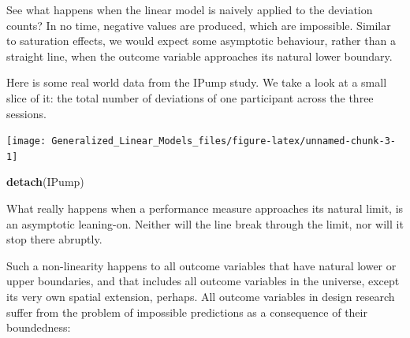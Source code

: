 \documentclass[]{svmono}
\newenvironment{Shaded}{\begin{snugshade}}{\end{snugshade}}
\newcommand{\KeywordTok}[1]{\textcolor[rgb]{0.13,0.29,0.53}{\textbf{#1}}}
\newcommand{\DataTypeTok}[1]{\textcolor[rgb]{0.13,0.29,0.53}{#1}}
\newcommand{\DecValTok}[1]{\textcolor[rgb]{0.00,0.00,0.81}{#1}}
\newcommand{\StringTok}[1]{\textcolor[rgb]{0.31,0.60,0.02}{#1}}
\newcommand{\OperatorTok}[1]{\textcolor[rgb]{0.81,0.36,0.00}{\textbf{#1}}}
\newcommand{\NormalTok}[1]{#1}
\begin{document}
See what happens when the linear model is naively applied to the
deviation counts? In no time, negative values are produced, which are
impossible. Similar to saturation effects, we would expect some
asymptotic behaviour, rather than a straight line, when the outcome
variable approaches its natural lower boundary.

Here is some real world data from the IPump study. We take a look at a
small slice of it: the total number of deviations of one participant
across the three sessions.

\begin{Shaded}
\end{Shaded}

\texttt{[image: Generalized\_Linear\_Models\_files/figure-latex/unnamed-chunk-3-1]}

\begin{Shaded}
\begin{Highlighting}[]
\KeywordTok{detach}\NormalTok{(IPump)}
\end{Highlighting}
\end{Shaded}

What really happens when a performance measure approaches its natural
limit, is an asymptotic leaning-on. Neither will the line break through
the limit, nor will it stop there abruptly.

Such a non-linearity happens to all outcome variables that have natural
lower or upper boundaries, and that includes all outcome variables in
the universe, except its very own spatial extension, perhaps. All
outcome variables in design research suffer from the problem of
impossible predictions as a consequence of their boundedness:
\end{document}
